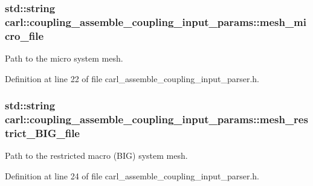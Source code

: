 \hypertarget{structcarl_1_1coupling__assemble__coupling__input__params_a704cd64a2a6e9c980a46130bc9ec921b}{}
\subsubsection[{mesh\+\_\+micro\+\_\+file}]{\setlength{\rightskip}{0pt plus 5cm}std\+::string carl\+::coupling\+\_\+assemble\+\_\+coupling\+\_\+input\+\_\+params\+::mesh\+\_\+micro\+\_\+file}\label{structcarl_1_1coupling__assemble__coupling__input__params_a704cd64a2a6e9c980a46130bc9ec921b}


Path to the micro system mesh. 



Definition at line 22 of file carl\+\_\+assemble\+\_\+coupling\+\_\+input\+\_\+parser.\+h.

\hypertarget{structcarl_1_1coupling__assemble__coupling__input__params_ad2f08c3035377449238a1d830c666630}{}
\subsubsection[{mesh\+\_\+restrict\+\_\+\+B\+I\+G\+\_\+file}]{\setlength{\rightskip}{0pt plus 5cm}std\+::string carl\+::coupling\+\_\+assemble\+\_\+coupling\+\_\+input\+\_\+params\+::mesh\+\_\+restrict\+\_\+\+B\+I\+G\+\_\+file}\label{structcarl_1_1coupling__assemble__coupling__input__params_ad2f08c3035377449238a1d830c666630}


Path to the restricted macro (B\+I\+G) system mesh. 



Definition at line 24 of file carl\+\_\+assemble\+\_\+coupling\+\_\+input\+\_\+parser.\+h.

